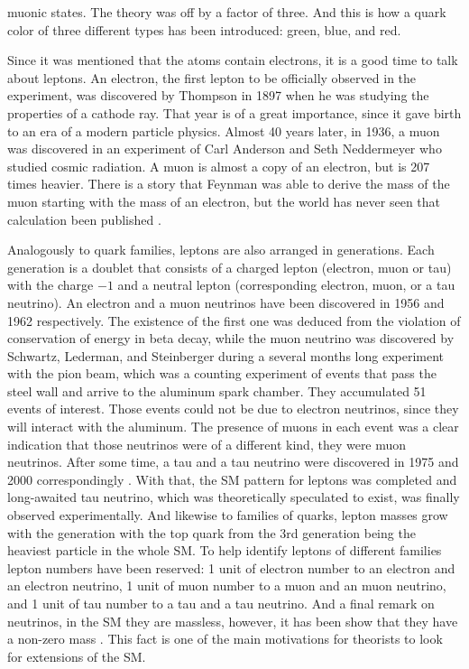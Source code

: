 muonic states. The theory was off by a factor of three. And this is how a quark color of three different types has been introduced: green, blue, and red. 



Since it was mentioned that the atoms contain electrons, it is a good time to talk about leptons. An electron, the first lepton to be officially observed in the experiment, was discovered by Thompson \cite{Davis:1989898} in 1897 when he was studying the properties of a cathode ray. That year is of a great importance, since it gave birth to an era of a modern particle physics. Almost 40 years later, in 1936, a muon was discovered \cite{Piccioni1996} in an experiment of Carl Anderson and Seth Neddermeyer who studied cosmic radiation. A muon is almost a copy of an electron, but is 207 times heavier. There is a story that Feynman was able to derive the mass of the muon starting with the mass of an electron, but the world has never seen that calculation been published \cite{Bender_feynman_muon}. 

Analogously to quark families, leptons are also arranged in generations. Each generation is a doublet that consists of a charged lepton (electron, muon or tau) with the charge $-1$ and a neutral lepton (corresponding electron, muon, or a tau neutrino). An electron and a muon neutrinos have been discovered in 1956 and 1962 respectively. The existence of the first one was deduced from the violation of conservation of energy in beta decay, while the muon neutrino \cite{PhysRevLett.9.36} was discovered by Schwartz, Lederman, and Steinberger during a several months long experiment with the pion beam, which was a counting experiment of events that pass the steel wall and arrive to the aluminum spark chamber. They accumulated 51 events of interest. Those events could not be due to electron neutrinos, since they will interact with the aluminum. The presence of muons in each event was a clear indication that those neutrinos were of a different kind, they were muon neutrinos. After some time, a tau and a tau neutrino were discovered in 1975 and 2000 correspondingly \cite{PhysRevLett.35.1489, Kodama:2000mp}. With that, the SM pattern for leptons was completed and long-awaited tau neutrino, which was theoretically speculated to exist, was finally observed experimentally. And likewise to families of quarks, lepton masses grow with the generation with the top quark from the 3rd generation being the heaviest particle in the whole SM. To help identify leptons of different families lepton numbers have been reserved: 1 unit of electron number to an electron and an electron neutrino, 1 unit of muon number to a muon and an muon neutrino, and 1 unit of tau number to a tau and a tau neutrino. And a final remark on neutrinos, in the SM they are massless, however, it has been show that they have a non-zero mass \cite{Bilenky:2014ema}. This fact is one of the main motivations for theorists to look for extensions of the SM. 

